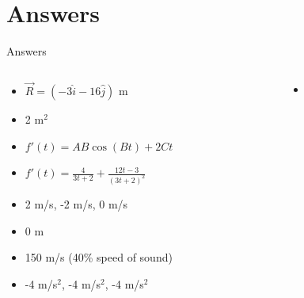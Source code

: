 \documentclass{beamer}
\begin{document}
\section{Answers}

\begin{frame}{Answers}
\begin{columns}[T]
\begin{column}{0.5\textwidth}
\begin{itemize}
\item $\vec{R} =  (-3\hat{i}-16\hat{j})$ m
\item 2 m$^2$
\item $f'(t) = AB\cos(Bt) + 2Ct$
\item $f'(t) = \frac{4}{3t+2}+\frac{12t-3}{(3t+2)^2}$
\item 2 m/s, -2 m/s, 0 m/s
\item 0 m
\item 150 m/s (40\% speed of sound)
\item -4 m/s$^2$, -4 m/s$^2$, -4 m/s$^2$
\end{itemize}
\end{column}
\begin{column}{0.5\textwidth}
\begin{itemize}
\item 
\end{itemize}
\end{column}
\end{columns}
\end{frame}
\end{document}

